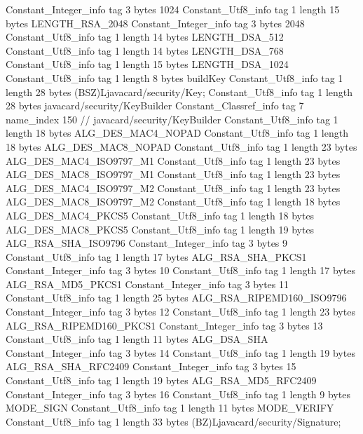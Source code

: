 {{{		}
		Constant_Integer_info {
			tag	3
			bytes	1024
		}
		Constant_Utf8_info {
			tag	1
			length	15
			bytes	LENGTH_RSA_2048
		}
		Constant_Integer_info {
			tag	3
			bytes	2048
		}
		Constant_Utf8_info {
			tag	1
			length	14
			bytes	LENGTH_DSA_512
		}
		Constant_Utf8_info {
			tag	1
			length	14
			bytes	LENGTH_DSA_768
		}
		Constant_Utf8_info {
			tag	1
			length	15
			bytes	LENGTH_DSA_1024
		}
		Constant_Utf8_info {
			tag	1
			length	8
			bytes	buildKey
		}
		Constant_Utf8_info {
			tag	1
			length	28
			bytes	(BSZ)Ljavacard/security/Key;
		}
		Constant_Utf8_info {
			tag	1
			length	28
			bytes	javacard/security/KeyBuilder
		}
		Constant_Classref_info {
			tag	7
			name_index	150		// javacard/security/KeyBuilder
		}
		Constant_Utf8_info {
			tag	1
			length	18
			bytes	ALG_DES_MAC4_NOPAD
		}
		Constant_Utf8_info {
			tag	1
			length	18
			bytes	ALG_DES_MAC8_NOPAD
		}
		Constant_Utf8_info {
			tag	1
			length	23
			bytes	ALG_DES_MAC4_ISO9797_M1
		}
		Constant_Utf8_info {
			tag	1
			length	23
			bytes	ALG_DES_MAC8_ISO9797_M1
		}
		Constant_Utf8_info {
			tag	1
			length	23
			bytes	ALG_DES_MAC4_ISO9797_M2
		}
		Constant_Utf8_info {
			tag	1
			length	23
			bytes	ALG_DES_MAC8_ISO9797_M2
		}
		Constant_Utf8_info {
			tag	1
			length	18
			bytes	ALG_DES_MAC4_PKCS5
		}
		Constant_Utf8_info {
			tag	1
			length	18
			bytes	ALG_DES_MAC8_PKCS5
		}
		Constant_Utf8_info {
			tag	1
			length	19
			bytes	ALG_RSA_SHA_ISO9796
		}
		Constant_Integer_info {
			tag	3
			bytes	9
		}
		Constant_Utf8_info {
			tag	1
			length	17
			bytes	ALG_RSA_SHA_PKCS1
		}
		Constant_Integer_info {
			tag	3
			bytes	10
		}
		Constant_Utf8_info {
			tag	1
			length	17
			bytes	ALG_RSA_MD5_PKCS1
		}
		Constant_Integer_info {
			tag	3
			bytes	11
		}
		Constant_Utf8_info {
			tag	1
			length	25
			bytes	ALG_RSA_RIPEMD160_ISO9796
		}
		Constant_Integer_info {
			tag	3
			bytes	12
		}
		Constant_Utf8_info {
			tag	1
			length	23
			bytes	ALG_RSA_RIPEMD160_PKCS1
		}
		Constant_Integer_info {
			tag	3
			bytes	13
		}
		Constant_Utf8_info {
			tag	1
			length	11
			bytes	ALG_DSA_SHA
		}
		Constant_Integer_info {
			tag	3
			bytes	14
		}
		Constant_Utf8_info {
			tag	1
			length	19
			bytes	ALG_RSA_SHA_RFC2409
		}
		Constant_Integer_info {
			tag	3
			bytes	15
		}
		Constant_Utf8_info {
			tag	1
			length	19
			bytes	ALG_RSA_MD5_RFC2409
		}
		Constant_Integer_info {
			tag	3
			bytes	16
		}
		Constant_Utf8_info {
			tag	1
			length	9
			bytes	MODE_SIGN
		}
		Constant_Utf8_info {
			tag	1
			length	11
			bytes	MODE_VERIFY
		}
		Constant_Utf8_info {
			tag	1
			length	33
			bytes	(BZ)Ljavacard/security/Signature;
}}}
